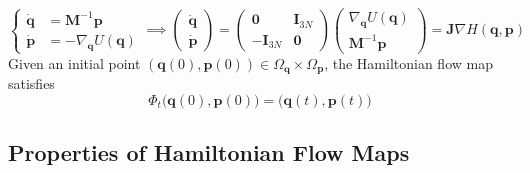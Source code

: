     \begin{equation}
      \begin{cases} \boldsymbol{\dot{q}} & = \mathbf{M}^{-1} \mathbf{p} \\
      \boldsymbol{\dot{p}} & = - \nabla_\mathbf{q} U(\mathbf{q}) \end{cases} \implies \begin{pmatrix} \boldsymbol{\dot{q}} \\ \boldsymbol{\dot{p}} \end{pmatrix} = \begin{pmatrix} \mathbf{0} & \mathbf{I}_{3N} \\ -\mathbf{I}_{3N} & \mathbf{0} \end{pmatrix} \begin{pmatrix} \nabla_\mathbf{q} U (\mathbf{q})\\ \mathbf{M}^{-1} \mathbf{p} \end{pmatrix} = \mathbf{J} \nabla H(\mathbf{q}, \mathbf{p})
    \end{equation}
    Given an initial point $(\mathbf{q}(0), \mathbf{p}(0)) \in \Omega_{\mathbf{q}} \times \Omega_{\mathbf{p}}$, the Hamiltonian flow map satisfies 
    \begin{equation}
      \Phi_t \big( \mathbf{q}(0), \mathbf{p}(0) \big) = \big(\mathbf{q}(t), \mathbf{p}(t)\big)
    \end{equation}

  \subsection{Properties of Hamiltonian Flow Maps}

